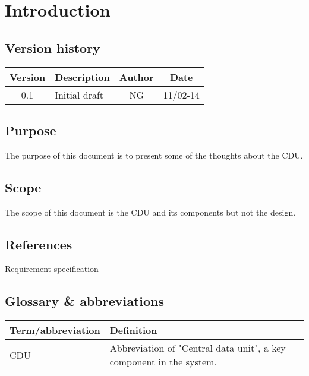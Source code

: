 \chapter{Introduction}
\section{Version history}
\begin{table}[H]
\begin{tabular}{|c|p{9cm}|c|c|}
\hline
Version & Description & Author & Date\\
\hline
0.1 & Initial draft & NG & 11/02-14\\
\hline
\end{tabular}
\end{table}

\section{Purpose}
The purpose of this document is to present some of the thoughts about the CDU. 

\section{Scope}
The scope of this document is the CDU and its components but not the design.

\section{References}
Requirement specification

\section{Glossary \& abbreviations}
\begin{table}[H]
\centering
\begin{tabular}{|p{4cm}|p{7cm}|}
\hline
Term/abbreviation & Definition\\ \hline
CDU & Abbreviation of "Central data unit", a key component in the system. \\ \hline
\end{tabular}
\end{table}

